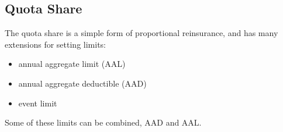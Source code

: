 \subsection{Quota Share}
\label{subsec:QuatoShare}

The quota share is a simple form of proportional reinsurance, and has many extensions for setting limits:
\begin{itemize}
						\item annual aggregate limit (AAL) 
						\item annual aggregate deductible (AAD) 
						\item event limit 
\end{itemize}
Some of these limits can be combined, \eg AAD and AAL.

